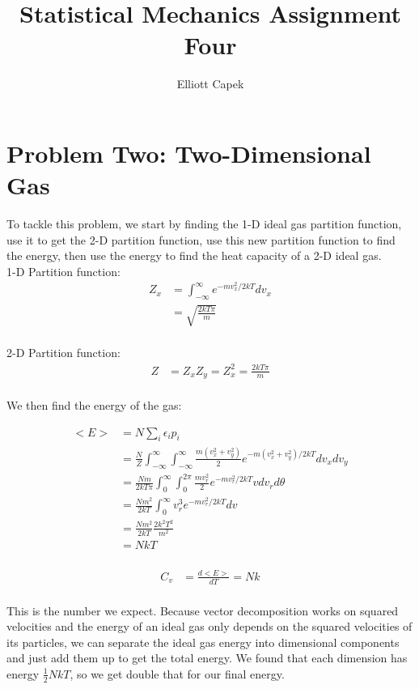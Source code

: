 \documentclass[10pt]{article} %
\title{Statistical Mechanics Assignment Four}
\author{Elliott Capek}
\begin{document}
\maketitle{}

\section{Problem Two: Two-Dimensional Gas}
To tackle this problem, we start by finding the 1-D ideal gas partition function, use it to get the
2-D partition function, use this new partition function to find the energy, then use the energy
to find the heat capacity of a 2-D ideal gas.\\

1-D Partition function:
\begin{align*}
  Z_x &= \int_{-\infty}^{\infty} e^{-mv_x^2/2kT} dv_x\\
  &= \sqrt{\frac{2kT\pi}{m}}\\
\end{align*}

2-D Partition function:
\begin{align*}
  Z &= Z_xZ_y = Z_x^2 = \frac{2kT\pi}{m}\\
\end{align*}

We then find the energy of the gas:

\begin{align*}
  <E> &= N\sum_{i} \epsilon_i p_i\\
  &= \frac{N}{Z}\int_{-\infty}^{\infty}\int_{-\infty}^{\infty}
  \frac{m(v_x^2+v_y^2)}{2}e^{-m(v_x^2+v_y^2)/2kT} dv_xdv_y\\
  &= \frac{Nm}{2kT\pi}
  \int_{0}^{\infty}\int_0^{2\pi}\frac{mv_r^2}{2}e^{-mv_r^2/2kT}vdv_rd\theta\\
  &= \frac{Nm^2}{2kT} \int_{0}^{\infty} v_r^3e^{-mv_r^2/2kT}dv\\
  &= \frac{Nm^2}{2kT}\frac{2k^2T^2}{m^2}\\
  &= NkT\\
\end{align*}

\begin{align*}
  C_v &= \frac{d<E>}{dT} = Nk\\
\end{align*}

This is the number we expect. Because vector decomposition works on squared velocities and the
energy of an ideal gas only depends on the squared velocities of its particles, we can separate
the ideal gas energy into dimensional components and just add them up to get the total energy.
We found that each dimension has energy $\frac{1}{2}NkT$, so we get double that for our final
energy.\\
\end{document}
